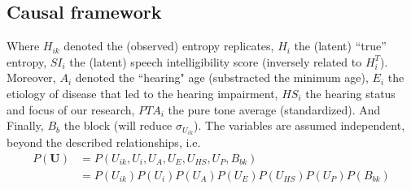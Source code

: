 \subsection{Causal framework} 
%
Where $H_{ik}$ denoted the (observed) entropy replicates, $H_{i}$ the (latent) ``true'' entropy, $SI_{i}$ the (latent) speech intelligibility score (inversely related to $H^{T}_{i}$). Moreover, $A_{i}$ denoted the ``hearing" age (substracted the minimum age), $E_{i}$ the etiology of disease that led to the hearing impairment, $HS_{i}$ the hearing status and focus of our research, $PTA_{i}$ the pure tone average (standardized). And Finally, $B_{b}$ the block (will reduce $\sigma_{U_{ik}}$). The variables are assumed independent, beyond the described relationships, i.e. 
%
\begin{equation*}
	\begin{aligned} 
		P(\pmb{U}) & = P(U_{ik}, U_{i}, U_{A}, U_{E}, U_{HS}, U_{P}, B_{bk}) \\ 
		& = P(U_{ik}) P(U_{i}) P(U_{A}) P(U_{E}) P(U_{HS}) P(U_{P}) P(B_{bk})
	\end{aligned}
\end{equation*}
%
%
